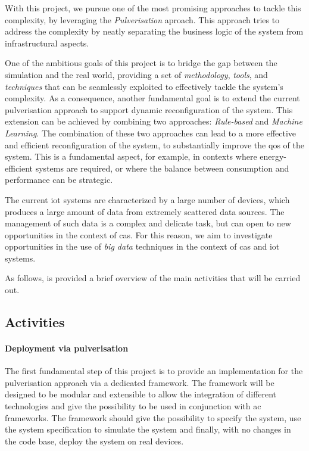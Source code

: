 \documentclass[12pt]{article}
\begin{document}
With this project,
we pursue one of the most promising approaches to tackle this complexity,
by leveraging the \emph{Pulverisation} aproach.
%
This approach tries to address the complexity by neatly separating the business logic of the system from infrastructural aspects.

One of the ambitious goals of this project is to bridge the gap between the simulation and the real world,
providing a set of \emph{methodology}, \emph{tools}, and \emph{techniques}
that can be seamlessly exploited to effectively tackle the system's complexity.
%
As a consequence,
another fundamental goal is to extend the current pulverisation approach to support dynamic reconfiguration of the system.
%
This extension can be achieved by combining two approaches: \emph{Rule-based} and \emph{Machine Learning}.
%
The combination of these two approaches can lead to a more effective and efficient reconfiguration of the system,
to substantially improve the \ac{qos} of the system.
%
This is a fundamental aspect,
for example,
in contexts where energy-efficient systems are required,
or where the balance between consumption and performance can be strategic.

The current \ac{iot} systems are characterized by a large number of devices,
which produces a large amount of data from extremely scattered data sources.
%
The management of such data is a complex and delicate task,
but can open to new opportunities in the context of \ac{cas}.
%
For this reason,
we aim to investigate opportunities in the use of \emph{big data} techniques in the context of \ac{cas} and \ac{iot} systems.

As follows, is provided a brief overview of the main activities that will be carried out.

\subsection{Activities}\label{subsec:activities}

\paragraph{Deployment via pulverisation}
The first fundamental step of this project is to provide an implementation for
the pulverisation approach via a dedicated framework.
%
The framework will be designed to be modular and extensible to allow the integration
of different technologies and give the possibility to be used in conjunction with
\ac{ac} frameworks.
%
The framework should give the possibility to specify the system,
use the system specification to simulate the system
and finally, with no changes in the code base,
deploy the system on real devices.
\end{document}
